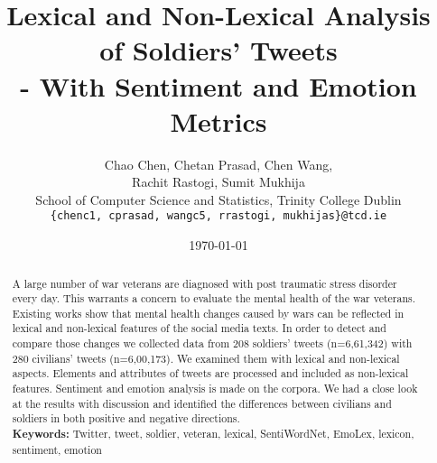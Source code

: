 \documentclass[english,a4paper,11pt]{article}
\title{Lexical and Non-Lexical Analysis of Soldiers' Tweets\\- With Sentiment and Emotion Metrics}
\date{\today}
\author{
  Chao Chen, Chetan Prasad, Chen Wang, \\
  Rachit Rastogi, Sumit Mukhija \\
  School of Computer Science and Statistics, Trinity College Dublin\\
  \texttt{\{chenc1, cprasad, wangc5, rrastogi, mukhijas\}@tcd.ie}
}
\begin{document}
\maketitle
\thispagestyle{empty}
\pagestyle{empty}

\begin{abstract}
  A large number of war veterans are diagnosed with post traumatic stress disorder every day. This warrants a concern to evaluate the mental health of the war veterans. Existing works show that mental health changes caused by wars can be reflected in lexical and non-lexical features of the social media texts. In order to detect and compare those changes we collected data from 208 soldiers' tweets (n=6,61,342) with 280 civilians' tweets (n=6,00,173). We examined them with lexical and non-lexical aspects. Elements and attributes of tweets are processed and included as non-lexical features. Sentiment and emotion analysis is made on the corpora. We had a close look at the results with discussion and identified the differences between civilians and soldiers in both positive and negative directions. \\
  \textbf{Keywords:} Twitter, tweet, soldier, veteran, lexical, SentiWordNet, EmoLex, lexicon, sentiment, emotion
\end{abstract}








\clearpage



\end{document}
